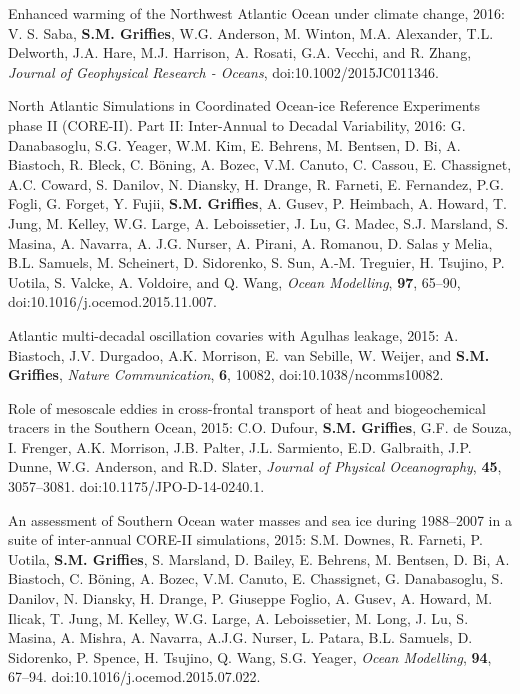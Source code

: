 \begin{etaremune}
\item Enhanced warming of the Northwest Atlantic Ocean under climate
  change, 2016: V. S. Saba, {\bf S.M. Grif\/f\/ies}, W.G. Anderson,
  M. Winton, M.A. Alexander, T.L. Delworth, J.A. Hare, M.J. Harrison,
  A. Rosati, G.A. Vecchi, and R. Zhang, {\it Journal of Geophysical
    Research - Oceans}, doi:10.1002/2015JC011346.

\item North Atlantic Simulations in Coordinated Ocean-ice Reference
  Experiments phase II (CORE-II). Part II: Inter-Annual to Decadal
  Variability, 2016: G. Danabasoglu, S.G. Yeager, W.M. Kim,
  E. Behrens, M. Bentsen, D. Bi, A. Biastoch, R. Bleck, C. B\"{o}ning,
  A. Bozec, V.M. Canuto, C. Cassou, E. Chassignet, A.C. Coward,
  S. Danilov, N. Diansky, H. Drange, R. Farneti, E. Fernandez,
  P.G. Fogli, G. Forget, Y. Fujii, {\bf S.M. Grif\/f\/ies}, A. Gusev,
  P. Heimbach, A. Howard, T. Jung, M. Kelley, W.G. Large,
  A. Leboissetier, J. Lu, G. Madec, S.J. Marsland, S. Masina,
  A. Navarra, A. J.G. Nurser, A. Pirani, A. Romanou, D. Salas y Melia,
  B.L. Samuels, M. Scheinert, D. Sidorenko, S. Sun, A.-M. Treguier,
  H. Tsujino, P. Uotila, S. Valcke, A. Voldoire, and Q. Wang, {\it Ocean Modelling}, {\bf 97}, 65--90, 
doi:10.1016/j.ocemod.2015.11.007.

\item Atlantic multi-decadal oscillation covaries with Agulhas leakage, 2015: A. Biastoch, J.V. Durgadoo, A.K. Morrison, E. van Sebille, W. Weijer, and {\bf S.M. Grif\/f\/ies}, {\it Nature Communication}, {\bf 6}, 10082, doi:10.1038/ncomms10082.

\item Role of mesoscale eddies in cross-frontal transport of heat and biogeochemical tracers in the Southern Ocean, 2015: C.O. Dufour,
  {\bf S.M. Grif\/f\/ies}, G.F. de Souza, I. Frenger, A.K. Morrison,
  J.B. Palter, J.L. Sarmiento, E.D. Galbraith, J.P. Dunne,
  W.G. Anderson, and R.D. Slater, {\it Journal of Physical
    Oceanography}, {\bf 45}, 3057--3081. 
    doi:10.1175/JPO-D-14-0240.1.

\item An assessment of Southern Ocean water masses and sea ice during
  1988--2007 in a suite of inter-annual CORE-II simulations, 2015:
  S.M. Downes, R. Farneti, P. Uotila, {\bf S.M. Grif\/f\/ies},
  S. Marsland, D. Bailey, E. Behrens, M. Bentsen, D. Bi, A. Biastoch,
  C. B\"oning, A. Bozec, V.M. Canuto, E. Chassignet, G. Danabasoglu,
  S. Danilov, N. Diansky, H. Drange, P. Giuseppe Foglio, A. Gusev,
  A. Howard, M. Ilicak, T.  Jung, M. Kelley, W.G. Large,
  A. Leboissetier, M. Long, J. Lu, S. Masina, A. Mishra, A. Navarra,
  A.J.G. Nurser, L. Patara, B.L. Samuels, D. Sidorenko, P. Spence,
  H. Tsujino, Q. Wang, S.G. Yeager, {\it Ocean Modelling}, {\bf 94},
  67--94.  doi:10.1016/j.ocemod.2015.07.022.



\end{etaremune}
